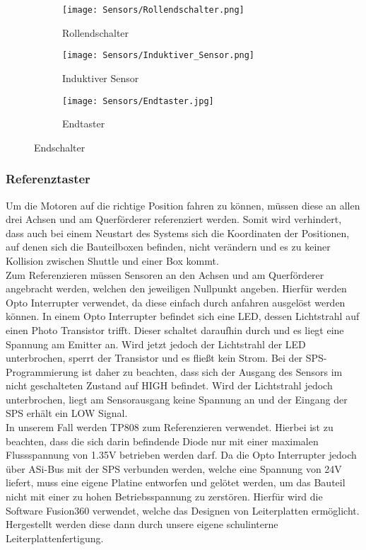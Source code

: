 \begin{figure}[H]
    \centering
    \begin{subfigure}{.3\textwidth}
        \centering
        \texttt{[image: Sensors/Rollendschalter.png]}
        \caption{Rollendschalter \cite{schmersal_pic}}
        \label{roll_sens}
    \end{subfigure}%
    \begin{subfigure}{.3\textwidth}
        \centering
        \texttt{[image: Sensors/Induktiver\_Sensor.png]}
        \caption{Induktiver Sensor \cite{induktiv_sensor}}
        \label{ind_sens}
    \end{subfigure}%
    \begin{subfigure}{.3\textwidth}
        \centering
        \texttt{[image: Sensors/Endtaster.jpg]}
        \caption{Endtaster}
        \label{tast_sens}
    \end{subfigure}
    \caption{Endschalter}
    \label{ulr}
\end{figure}

\subsubsection{Referenztaster}
Um die Motoren auf die richtige Position fahren zu können, müssen diese an allen drei Achsen und am Querförderer referenziert werden. Somit wird verhindert, dass auch bei einem Neustart des Systems sich die Koordinaten der Positionen, auf denen sich die Bauteilboxen befinden, nicht verändern und es zu keiner Kollision zwischen Shuttle und einer Box kommt.\\
Zum Referenzieren müssen Sensoren an den Achsen und am Querförderer angebracht werden, welchen den jeweiligen Nullpunkt angeben. Hierfür werden Opto Interrupter verwendet, da diese einfach durch anfahren ausgelöst werden können. In einem Opto Interrupter befindet sich eine LED, dessen Lichtstrahl auf einen Photo Transistor trifft. Dieser schaltet daraufhin durch und es liegt eine Spannung am Emitter an. Wird jetzt jedoch der Lichtstrahl der LED unterbrochen, sperrt der Transistor und es fließt kein Strom. Bei der SPS-Programmierung ist daher zu beachten, dass sich der Ausgang des Sensors im nicht geschalteten Zustand auf HIGH befindet. Wird der Lichtstrahl jedoch unterbrochen, liegt am Sensorausgang keine Spannung an und der Eingang der SPS erhält ein LOW Signal.\\
In unserem Fall werden TP808 zum Referenzieren verwendet. Hierbei ist zu beachten, dass die sich darin befindende Diode nur mit einer maximalen Flussspannung von 1.35V betrieben werden darf.\cite{TP808} Da die Opto Interrupter jedoch über ASi-Bus mit der SPS verbunden werden, welche eine Spannung von 24V liefert, muss eine eigene Platine entworfen und gelötet werden, um das Bauteil nicht mit einer zu hohen Betriebsspannung zu zerstören. Hierfür wird die Software Fusion360 verwendet, welche das Designen von Leiterplatten ermöglicht. Hergestellt werden diese dann durch unsere eigene schulinterne Leiterplattenfertigung.

